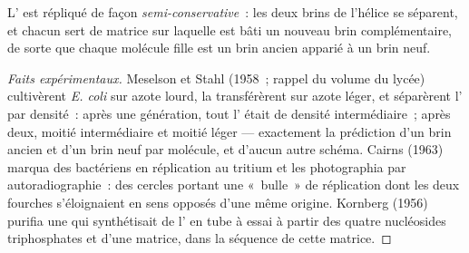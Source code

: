 \begin{proposition}\label{prop:b1:replication-mitosis:semiconservative}
L' est répliqué de façon \emph{semi-conservative}~: les deux brins de
l'hélice se séparent, et chacun sert de matrice sur laquelle est bâti un
nouveau brin complémentaire, de sorte que chaque molécule fille est un
brin ancien apparié à un brin neuf.
\end{proposition}
\begin{proof}[Faits expérimentaux]
Meselson et Stahl (1958~; rappel du volume du lycée) cultivèrent
\emph{E. coli} sur azote lourd, la transférèrent sur azote léger, et
séparèrent l' par densité~: après une génération, tout l' était de
densité intermédiaire~; après deux, moitié intermédiaire et moitié
léger --- exactement la prédiction d'un brin ancien et d'un brin neuf par
molécule, et d'aucun autre schéma. Cairns (1963) marqua des 
bactériens en réplication au tritium et les photographia par
autoradiographie~: des cercles portant une «~bulle~» de réplication dont
les deux fourches s'éloignaient en sens opposés d'une même origine.
Kornberg (1956) purifia une  qui synthétisait de l' en tube à
essai à partir des quatre nucléosides triphosphates et d'une matrice,
dans la séquence de cette matrice.
\end{proof}

